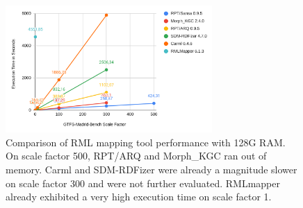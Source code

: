 \begin{figure}[htb]
\centering
\includegraphics[width=0.7\textwidth]{images/rml-all-tools.png}
%
\caption{Comparison of RML mapping tool performance with 128G RAM. On scale factor 500, RPT/ARQ and Morph\_KGC ran out of memory. Carml and SDM-RDFizer were already a magnitude slower on scale factor 300 and were not further evaluated. RMLmapper already exhibited a very high execution time on scale factor 1.}
\label{fig:tool-comparison}
\end{figure}

